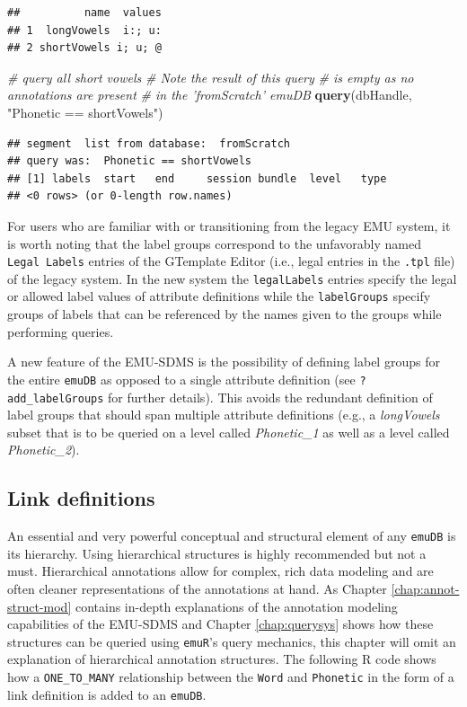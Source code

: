 \documentclass[]{book}
\newenvironment{Shaded}{\begin{snugshade}}{\end{snugshade}}
\newcommand{\CommentTok}[1]{\textcolor[rgb]{0.56,0.35,0.01}{\textit{#1}}}
\newcommand{\KeywordTok}[1]{\textcolor[rgb]{0.13,0.29,0.53}{\textbf{#1}}}
\newcommand{\NormalTok}[1]{#1}
\newcommand{\StringTok}[1]{\textcolor[rgb]{0.31,0.60,0.02}{#1}}
\begin{document}
\begin{verbatim}
##          name  values
## 1  longVowels  i:; u:
## 2 shortVowels i; u; @
\end{verbatim}

\begin{Shaded}
\begin{Highlighting}[]
\CommentTok{# query all short vowels}
\CommentTok{# Note the result of this query}
\CommentTok{# is empty as no annotations are present}
\CommentTok{# in the 'fromScratch' emuDB}
\KeywordTok{query}\NormalTok{(dbHandle, }\StringTok{"Phonetic == shortVowels"}\NormalTok{)}
\end{Highlighting}
\end{Shaded}

\begin{verbatim}
## segment  list from database:  fromScratch 
## query was:  Phonetic == shortVowels 
## [1] labels  start   end     session bundle  level   type   
## <0 rows> (or 0-length row.names)
\end{verbatim}

For users who are familiar with or transitioning from the legacy EMU system, it is worth noting that the label groups correspond to the unfavorably named \texttt{Legal\ Labels} entries of the GTemplate Editor (i.e., legal entries in the \texttt{.tpl} file) of the legacy system. In the new system the \texttt{legalLabels} entries specify the legal or allowed label values of attribute definitions while the \texttt{labelGroups} specify groups of labels that can be referenced by the names given to the groups while performing queries.

A new feature of the EMU-SDMS is the possibility of defining label groups for the entire \texttt{emuDB} as opposed to a single attribute definition (see \texttt{?add\_labelGroups} for further details). This avoids the redundant definition of label groups that should span multiple attribute definitions (e.g., a \emph{longVowels} subset that is to be queried on a level called \emph{Phonetic\_1} as well as a level called \emph{Phonetic\_2}).

\hypertarget{link-definitions}{%
\subsection{Link definitions}\label{link-definitions}}

An essential and very powerful conceptual and structural element of any \texttt{emuDB} is its hierarchy. Using hierarchical structures is highly recommended but not a must. Hierarchical annotations allow for complex, rich data modeling and are often cleaner representations of the annotations at hand. As Chapter \ref{chap:annot-struct-mod} contains in-depth explanations of the annotation modeling capabilities of the EMU-SDMS and Chapter \ref{chap:querysys} shows how these structures can be queried using \texttt{emuR}'s query mechanics, this chapter will omit an explanation of hierarchical annotation structures. The following R code shows how a \texttt{ONE\_TO\_MANY} relationship between the \texttt{Word} and \texttt{Phonetic} in the form of a link definition is added to an \texttt{emuDB}.
\end{document}
